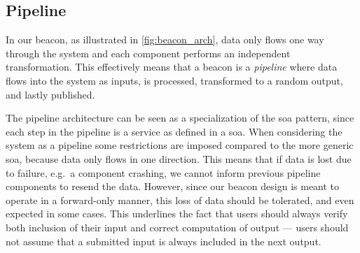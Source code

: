 \subsection{Pipeline}%
\label{sub:pipeline}
In our beacon, as illustrated in \cref{fig:beacon_arch}, data only flows one way through the system and each component performs an independent transformation.
This effectively means that a beacon is a \emph{pipeline} where data flows into the system as inputs, is processed, transformed to a random output, and lastly published.

The pipeline architecture can be seen as a specialization of the \gls{soa} pattern, since each step in the pipeline is a service as defined in a \gls{soa}.
When considering the system as a pipeline some restrictions are imposed compared to the more generic \gls{soa}, because data only flows in one direction.
This means that if data is lost due to failure, e.g.\ a component crashing, we cannot inform previous pipeline components to resend the data.
However, since our beacon design is meant to operate in a forward-only manner, this loss of data should be tolerated, and even expected in some cases.
This underlines the fact that users should always verify both inclusion of their input and correct computation of output --- users should not assume that a submitted input is always included in the next output.

